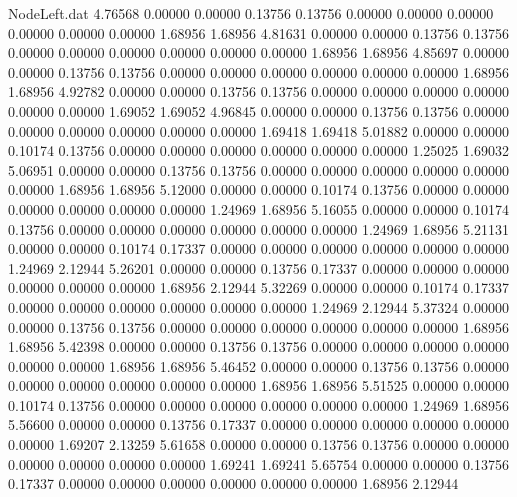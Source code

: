 \begin{filecontents}{NodeLeft.dat}
   4.76568    0.00000    0.00000     0.13756    0.13756    0.00000    0.00000    0.00000    0.00000    0.00000    0.00000    1.68956    1.68956
   4.81631    0.00000    0.00000     0.13756    0.13756    0.00000    0.00000    0.00000    0.00000    0.00000    0.00000    1.68956    1.68956
   4.85697    0.00000    0.00000     0.13756    0.13756    0.00000    0.00000    0.00000    0.00000    0.00000    0.00000    1.68956    1.68956
   4.92782    0.00000    0.00000     0.13756    0.13756    0.00000    0.00000    0.00000    0.00000    0.00000    0.00000    1.69052    1.69052
   4.96845    0.00000    0.00000     0.13756    0.13756    0.00000    0.00000    0.00000    0.00000    0.00000    0.00000    1.69418    1.69418
   5.01882    0.00000    0.00000     0.10174    0.13756    0.00000    0.00000    0.00000    0.00000    0.00000    0.00000    1.25025    1.69032
   5.06951    0.00000    0.00000     0.13756    0.13756    0.00000    0.00000    0.00000    0.00000    0.00000    0.00000    1.68956    1.68956
   5.12000    0.00000    0.00000     0.10174    0.13756    0.00000    0.00000    0.00000    0.00000    0.00000    0.00000    1.24969    1.68956
   5.16055    0.00000    0.00000     0.10174    0.13756    0.00000    0.00000    0.00000    0.00000    0.00000    0.00000    1.24969    1.68956
   5.21131    0.00000    0.00000     0.10174    0.17337    0.00000    0.00000    0.00000    0.00000    0.00000    0.00000    1.24969    2.12944
   5.26201    0.00000    0.00000     0.13756    0.17337    0.00000    0.00000    0.00000    0.00000    0.00000    0.00000    1.68956    2.12944
   5.32269    0.00000    0.00000     0.10174    0.17337    0.00000    0.00000    0.00000    0.00000    0.00000    0.00000    1.24969    2.12944
   5.37324    0.00000    0.00000     0.13756    0.13756    0.00000    0.00000    0.00000    0.00000    0.00000    0.00000    1.68956    1.68956
   5.42398    0.00000    0.00000     0.13756    0.13756    0.00000    0.00000    0.00000    0.00000    0.00000    0.00000    1.68956    1.68956
   5.46452    0.00000    0.00000     0.13756    0.13756    0.00000    0.00000    0.00000    0.00000    0.00000    0.00000    1.68956    1.68956
   5.51525    0.00000    0.00000     0.10174    0.13756    0.00000    0.00000    0.00000    0.00000    0.00000    0.00000    1.24969    1.68956
   5.56600    0.00000    0.00000     0.13756    0.17337    0.00000    0.00000    0.00000    0.00000    0.00000    0.00000    1.69207    2.13259
   5.61658    0.00000    0.00000     0.13756    0.13756    0.00000    0.00000    0.00000    0.00000    0.00000    0.00000    1.69241    1.69241
   5.65754    0.00000    0.00000     0.13756    0.17337    0.00000    0.00000    0.00000    0.00000    0.00000    0.00000    1.68956    2.12944

\end{filecontents}
